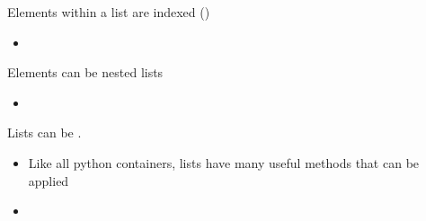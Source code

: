 \documentclass[letterpaper,10pt,english]{sphinxmanual}
\begin{document}
Elements within a list are indexed ()

\begin{sphinxVerbatim}[commandchars=\\\{\}]
\PYG{p}{[}\PYG{p}{]}
\end{sphinxVerbatim}
\begin{itemize}
\item {} 
\end{itemize}

Elements can be nested lists

\begin{sphinxVerbatim}[commandchars=\\\{\}]
  \PYG{p}{[}\PYG{p}{[}  \PYG{p}{]} \PYG{p}{[}  \PYG{p}{]} \PYG{p}{[}  \PYG{p}{]}\PYG{p}{]}
\end{sphinxVerbatim}
\begin{itemize}
\item {} 
\end{itemize}

Lists can be .

\begin{sphinxVerbatim}[commandchars=\\\{\}]
\PYG{p}{[}\PYG{p}{]}
\end{sphinxVerbatim}
\begin{itemize}
\item {} 
Like all python containers, lists have many useful methods that can be applied

\end{itemize}

\begin{sphinxVerbatim}[commandchars=\\\{\}]
 
    
\end{sphinxVerbatim}
\begin{itemize}
\item {} 
\end{itemize}
\end{document}
